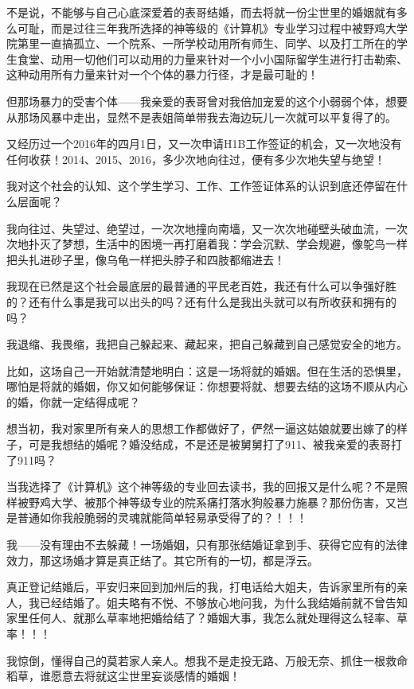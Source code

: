 \documentclass[9pt, b5paper]{article}
\begin{document}
不是说，不能够与自己心底深爱着的表哥结婚，而去将就一份尘世里的婚姻就有多么可耻，而是过往三年我所选择的神等级的《计算机》专业学习过程中被野鸡大学院第里一直搞孤立、一个院系、一所学校动用所有师生、同学、以及打工所在的学生食堂、动用一切他们可以动用的力量来针对一个小小国际留学生进行打击勒索、这种动用所有力量来针对一个个体的暴力行径，才是最可耻的！

但那场暴力的受害个体——我亲爱的表哥曾对我倍加宠爱的这个小弱弱个体，想要从那场风暴中走出，显然不是表姐简单带我去海边玩儿一次就可以平复得了的。

又经历过一个2016年的四月1日，又一次申请H1B工作签证的机会，又一次地没有任何收获！2014、2015、2016，多少次地向往过，便有多少次地失望与绝望！

我对这个社会的认知、这个学生学习、工作、工作签证体系的认识到底还停留在什么层面呢？

我向往过、失望过、绝望过，一次次地撞向南墙，又一次次地碰壁头破血流，一次次地扑灭了梦想，生活中的困境一再打磨着我：学会沉默、学会规避，像鸵鸟一样把头扎进砂子里，像乌龟一样把头脖子和四肢都缩进去！

我现在已然是这个社会最底层的最普通的平民老百姓，我还有什么可以争强好胜的？还有什么事是我可以出头的吗？还有什么是我出头就可以有所收获和拥有的吗？

我退缩、我畏缩，我把自己躲起来、藏起来，把自己躲藏到自己感觉安全的地方。

比如，这场自己一开始就清楚地明白：这是一场将就的婚姻。但在生活的恐惧里，哪怕是将就的婚姻，你又如何能够保证：你想要将就、想要去结的这场不顺从内心的婚，你就一定结得成呢？

想当初，我对家里所有亲人的思想工作都做好了，俨然一逼这姑娘就要出嫁了的样子，可是我想结的婚呢？婚没结成，不是还是被舅舅打了911、被我亲爱的表哥打了911吗？

当我选择了《计算机》这个神等级的专业回去读书，我的回报又是什么呢？不是照样被野鸡大学、被那个神等级专业的院系痛打落水狗般暴力施暴？那份伤害，又岂是普通如你我般脆弱的灵魂就能简单轻易承受得了的？！！！

我——没有理由不去躲藏！一场婚姻，只有那张结婚证拿到手、获得它应有的法律效力，那这场婚才算是真正结了。其它所有的一切，都是浮云。

真正登记结婚后，平安归来回到加州后的我，打电话给大姐夫，告诉家里所有的亲人，我已经结婚了。姐夫略有不悦、不够放心地问我，为什么我结婚前就不曾告知家里任何人、就那么草率地把婚给结了？婚姻大事，我怎么就处理得这么轻率、草率！！！

我惊倒，懂得自己的莫若家人亲人。想我不是走投无路、万般无奈、抓住一根救命稻草，谁愿意去将就这尘世里妄谈感情的婚姻！
\end{document}
